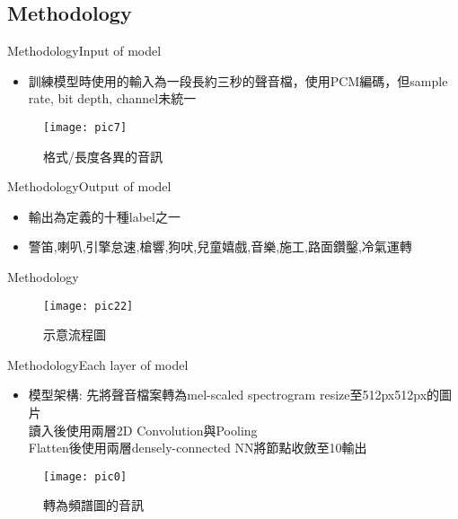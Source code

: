\documentclass{beamer}
\begin{document}
\begin{CJK}{UTF8}{bsmi}
\section{Methodology}
\begin{frame}{Methodology}{Input of model }
  \begin{itemize}
  \item {
   訓練模型時使用的輸入為一段長約三秒的聲音檔，使用PCM編碼，但sample rate, bit depth, channel未統一
  }
  \end{itemize}
\begin{figure}[H] %
\texttt{[image: pic7]} %
\caption{格式/長度各異的音訊} %
\end{figure}
\end{frame}
\begin{frame}{Methodology}{Output of model }
  \begin{itemize}
  \item {
   輸出為定義的十種label之一
  }
\item{警笛,喇叭,引擎怠速,槍響,狗吠,兒童嬉戲,音樂,施工,路面鑽鑿,冷氣運轉}
  \end{itemize}




\end{frame}
\begin{frame}{Methodology}
\begin{figure}[H] %
\texttt{[image: pic22]} %
\caption{示意流程圖} %
\end{figure}
\end{frame}
\begin{frame}{Methodology}{Each layer of model }
  \begin{itemize}
  \item {
    模型架構: 先將聲音檔案轉為mel-scaled spectrogram resize至512px512px的圖片\\讀入後使用兩層2D Convolution與Pooling\\Flatten後使用兩層densely-connected NN將節點收斂至10輸出
  }
  \end{itemize}
\begin{figure}[H] %
\texttt{[image: pic0]} %
\caption{轉為頻譜圖的音訊} %
\end{figure}
\end{frame}


\end{CJK}
\end{document}
